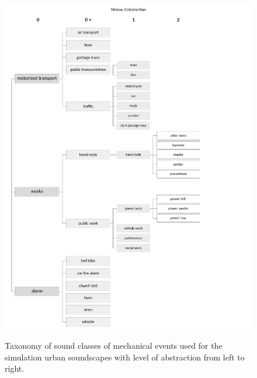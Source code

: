 \documentclass[12pt]{elsarticle}
\begin{document}
\begin{figure}[!hp]
    \centering
        {\includegraphics[trim={ 0 0 0cm 1cm},clip,width=.9\columnwidth]{gfx/appendix/event_1_en}\label{fig:taxonomieEventa}} \par
         \caption{Taxonomy of sound classes of mechanical events used for the simulation urban soundscapes  with level of abstraction from left to right.}
       \label{fig:taxonomieEa}
\end{figure}
\end{document}
